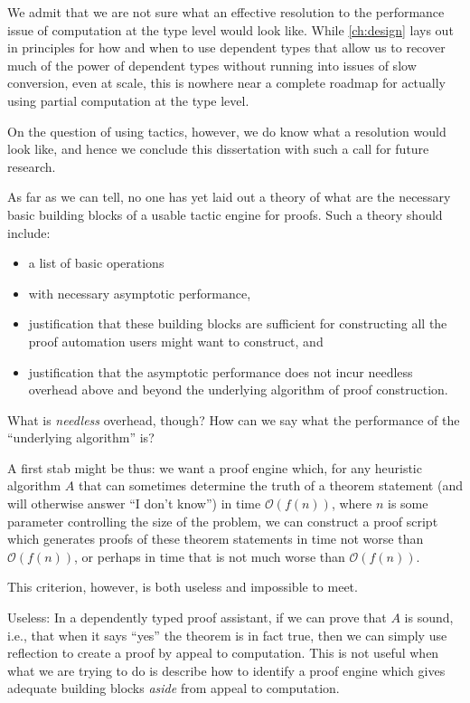 We admit that we are not sure what an effective resolution to the performance issue of computation at the type level would look like.
While \autoref{ch:design} lays out in  principles for how and when to use dependent types that allow us to recover much of the power of dependent types without running into issues of slow conversion, even at scale, this is nowhere near a complete roadmap for actually using partial computation at the type level.

On the question of using tactics, however, we do know what a resolution would look like, and hence we conclude this dissertation with such a call for future research.

As far as we can tell, no one has yet laid out a theory of what are the necessary basic building blocks of a usable tactic engine for proofs.
Such a theory should include:
\begin{itemize}
\item
  a list of basic operations
\item
  with necessary asymptotic performance,
\item
  justification that these building blocks are sufficient for constructing all the proof automation users might want to construct, and
\item
  justification that the asymptotic performance does not incur needless overhead above and beyond the underlying algorithm of proof construction.
\end{itemize}

What is \emph{needless} overhead, though?
How can we say what the performance of the ``underlying algorithm'' is?

A first stab might be thus: we want a proof engine which, for any heuristic algorithm $A$ that can sometimes determine the truth of a theorem statement (and will otherwise answer ``I don't know'') in time $\mathcal O(f(n))$, where $n$ is some parameter controlling the size of the problem, we can construct a proof script which generates proofs of these theorem statements in time not worse than $\mathcal O(f(n))$, or perhaps in time that is not much worse than $\mathcal O(f(n))$.

This criterion, however, is both useless and impossible to meet.

Useless:
In a dependently typed proof assistant, if we can prove that $A$ is sound, i.e., that when it says ``yes'' the theorem is in fact true, then we can simply use reflection to create a proof by appeal to computation.
This is not useful when what we are trying to do is describe how to identify a proof engine which gives adequate building blocks \emph{aside} from appeal to computation.

